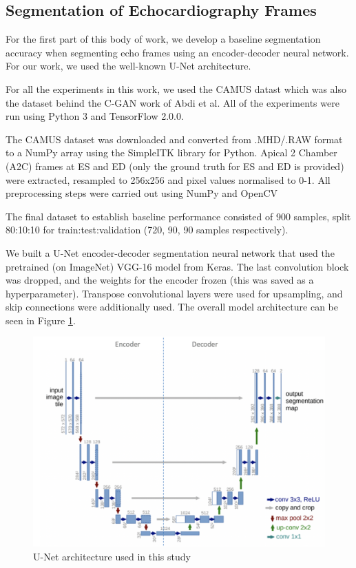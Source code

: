 \subsection{Segmentation of Echocardiography Frames}

For the first part of this body of work, we develop a baseline segmentation
accuracy when segmenting echo frames using an encoder-decoder neural network.
For our work, we used the well-known U-Net architecture. \newline

For all the experiments in this work, we used the CAMUS datast
\cite{leclercDeepLearningSegmentation2019} which was also the dataset behind the
C-GAN work of Abdi et al. All of the experiments were run using Python 3 and
TensorFlow 2.0.0.\newline

The CAMUS dataset was downloaded and converted from .MHD/.RAW format to a NumPy
array using the SimpleITK library for Python. Apical 2 Chamber (A2C) frames at
ES and ED (only the ground truth for ES and ED is provided) were extracted,
resampled to 256x256 and pixel values normalised to 0-1. All preprocessing steps
were carried out using NumPy and OpenCV \newline

The final dataset to establish baseline performance consisted of 900 samples,
split 80:10:10 for train:test:validation (720, 90, 90 samples respectively). \newline

We built a U-Net encoder-decoder segmentation neural network that used the
pretrained (on ImageNet) VGG-16 model from Keras. The last convolution block was
dropped, and the weights for the encoder frozen (this was saved as a
hyperparameter). Transpose convolutional layers were used for upsampling, and
skip connections were additionally used. The overall model architecture can be
seen in Figure \ref{fig:unet}. \newline


\begin{figure}[h]
    \centering
    \includegraphics[width=1.0\textwidth]{figures/unet.png}
    \caption{U-Net architecture used in this study}
    \label{fig:unet}
\end{figure}


